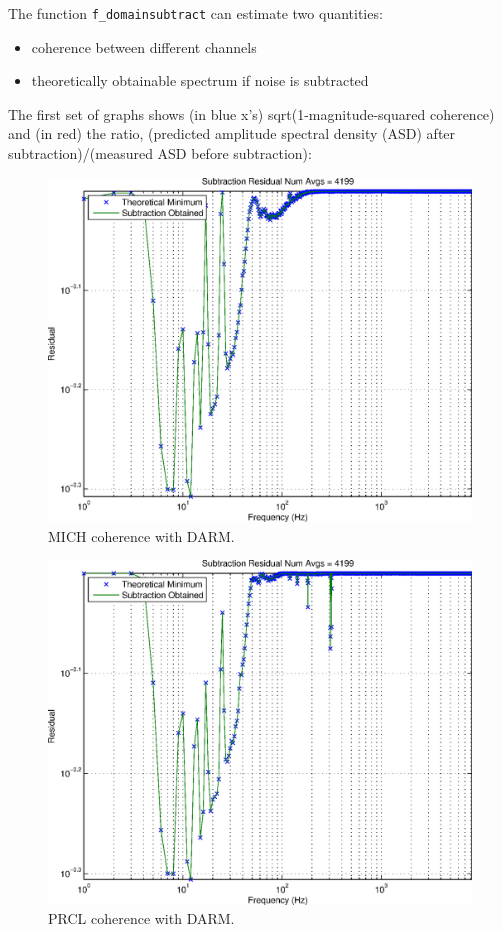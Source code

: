 The function \texttt{f\_domainsubtract} can estimate two quantities:
\begin{itemize}
\item coherence between different channels
\item theoretically obtainable spectrum if noise is subtracted
\end{itemize}

The first set of graphs shows (in blue x's) sqrt(1-magnitude-squared coherence) and (in red) the ratio, (predicted amplitude spectral density (ASD) after subtraction)/(measured ASD before subtraction):

\begin{figure}
\begin{center}
\includegraphics[width=0.4\paperwidth,height=0.3\paperheight]{SubtractionEstimate-MICH.eps}
\caption{
MICH coherence with DARM.
}
\end{center}
\end{figure}
\begin{figure}
\begin{center}
\includegraphics[width=0.4\paperwidth,height=0.3\paperheight]{SubtractionEstimate-PRCL.eps}
\caption{
PRCL coherence with DARM.
}
\end{center}
\end{figure}
